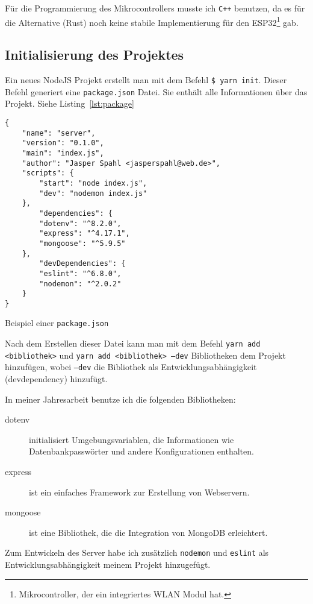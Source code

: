 \documentclass[a4paper, ngerman, 11pt]{scrartcl}
\begin{document}
Für die Programmierung des Mikrocontrollers musste ich \texttt{C++} benutzen, da es für die Alternative (Rust)
noch keine stabile Implementierung für den ESP32\footnote{Mikrocontroller, der ein integriertes WLAN Modul hat.} gab.

\subsection{Initialisierung des Projektes} %

Ein neues NodeJS Projekt erstellt man mit dem Befehl \texttt{\$ yarn init}.
Dieser Befehl generiert eine \texttt{package.json} Datei.
Sie enthält alle Informationen über das Projekt. Siehe Listing~\ref{lst:package}


\begin{listing}[ht]
\centering
\begin{verbatim}
{
    "name": "server",
    "version": "0.1.0",
    "main": "index.js",
    "author": "Jasper Spahl <jasperspahl@web.de>",
    "scripts": {
        "start": "node index.js",
        "dev": "nodemon index.js"
    },
        "dependencies": {
        "dotenv": "^8.2.0",
        "express": "^4.17.1",
        "mongoose": "^5.9.5"
    },
        "devDependencies": {
        "eslint": "^6.8.0",
        "nodemon": "^2.0.2"
    }
}
\end{verbatim}
\caption{Beispiel einer \texttt{package.json}\label{lst:package}}
\end{listing}

Nach dem Erstellen dieser Datei kann man mit dem Befehl \texttt{yarn add <bibliothek>} und \texttt{yarn add <bibliothek> --dev} Bibliotheken dem Projekt hinzufügen, wobei \texttt{--dev} die Bibliothek als Entwicklungsabhängigkeit (devdependency) hinzufügt.

In meiner Jahresarbeit benutze ich die folgenden Bibliotheken:

\begin{description}
	\item[dotenv] initialisiert Umgebungsvariablen, die Informationen wie Datenbankpasswörter und andere Konfigurationen enthalten.
	\item[express] ist ein einfaches Framework zur Erstellung von Webservern.
	\item[mongoose] ist eine Bibliothek, die die Integration von MongoDB erleichtert.
\end{description}

Zum Entwickeln des Server habe ich zusätzlich \texttt{nodemon} und \texttt{eslint} als Entwicklungsabhängigkeit meinem Projekt hinzugefügt.
\end{document}
